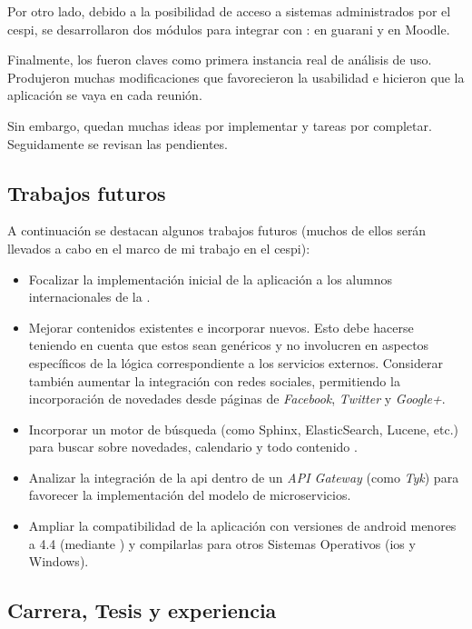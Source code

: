 Por otro lado, debido a la posibilidad de acceso a sistemas administrados por el \gls{cespi}, se desarrollaron dos módulos para integrar con \nombreApp{}: en \gls{guarani} y en Moodle.

Finalmente, los  fueron claves como primera instancia real de análisis de uso. Produjeron muchas modificaciones que favorecieron la usabilidad e hicieron que la aplicación se vaya  en cada reunión.

Sin embargo, quedan muchas ideas por implementar y tareas por completar. Seguidamente se revisan las pendientes.

\subsection{Trabajos futuros}
\label{trabajos_futuros}

A continuación se destacan algunos trabajos futuros (muchos de ellos serán llevados a cabo en el marco de mi trabajo en el \gls{cespi}):

\begin{itemize}
\item Focalizar la implementación inicial de la aplicación a los alumnos internacionales de la \unlp{}.
\item Mejorar contenidos existentes e incorporar nuevos. Esto debe hacerse teniendo en cuenta que estos sean genéricos y no involucren en aspectos específicos de la lógica correspondiente a los servicios externos. Considerar también aumentar la integración con redes sociales, permitiendo la incorporación de novedades desde páginas de \textit{Facebook}, \textit{Twitter} y  \textit{Google+}.
\item Incorporar un motor de búsqueda (como Sphinx, ElasticSearch, Lucene, etc.) para buscar sobre novedades, calendario y todo contenido .
\item Analizar la integración de la \gls{api} dentro de un \textit{API Gateway} (como \textit{Tyk}) para favorecer la implementación del modelo de microservicios.
\item Ampliar la compatibilidad de la aplicación con versiones de \gls{android} menores a 4.4 (mediante ) y compilarlas para otros Sistemas Operativos (\gls{ios} y Windows).
\end{itemize}

\subsection{Carrera, Tesis y experiencia}
\label{conclusion_carrera}

